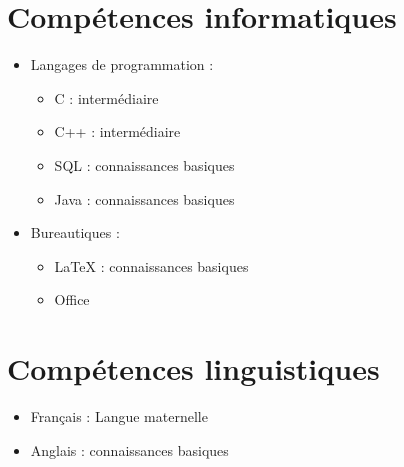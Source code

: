 \documentclass[a4paper]{article}
\begin{document}
\section*{Compétences informatiques}
\begin{itemize}
\item Langages de programmation : \begin{itemize}
\item C : intermédiaire 
\item C++ : intermédiaire
\item SQL : connaissances basiques
\item Java : connaissances basiques
\end{itemize}
\item Bureautiques : \begin{itemize}
\item LaTeX : connaissances basiques 
\item Office
\end{itemize}
\end{itemize}

\section*{Compétences linguistiques}
\begin{itemize}
\item Français : Langue maternelle
\item Anglais : connaissances basiques
\end{itemize}
\end{document}
